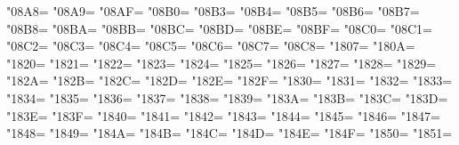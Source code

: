 \XeTeXcharclass"08A8=\KclassArabD
\XeTeXcharclass"08A9=\KclassArabD
\XeTeXcharclass"08AF=\KclassArabD
\XeTeXcharclass"08B0=\KclassArabD
\XeTeXcharclass"08B3=\KclassArabD
\XeTeXcharclass"08B4=\KclassArabD
\XeTeXcharclass"08B5=\KclassArabD
\XeTeXcharclass"08B6=\KclassArabD
\XeTeXcharclass"08B7=\KclassArabD
\XeTeXcharclass"08B8=\KclassArabD
\XeTeXcharclass"08BA=\KclassArabD
\XeTeXcharclass"08BB=\KclassArabD
\XeTeXcharclass"08BC=\KclassArabD
\XeTeXcharclass"08BD=\KclassArabD
\XeTeXcharclass"08BE=\KclassArabD
\XeTeXcharclass"08BF=\KclassArabD
\XeTeXcharclass"08C0=\KclassArabD
\XeTeXcharclass"08C1=\KclassArabD
\XeTeXcharclass"08C2=\KclassArabD
\XeTeXcharclass"08C3=\KclassArabD
\XeTeXcharclass"08C4=\KclassArabD
\XeTeXcharclass"08C5=\KclassArabD
\XeTeXcharclass"08C6=\KclassArabD
\XeTeXcharclass"08C7=\KclassArabD
\XeTeXcharclass"08C8=\KclassArabD
\XeTeXcharclass"1807=\KclassArabD
\XeTeXcharclass"180A=\KclassArabD
\XeTeXcharclass"1820=\KclassArabD
\XeTeXcharclass"1821=\KclassArabD
\XeTeXcharclass"1822=\KclassArabD
\XeTeXcharclass"1823=\KclassArabD
\XeTeXcharclass"1824=\KclassArabD
\XeTeXcharclass"1825=\KclassArabD
\XeTeXcharclass"1826=\KclassArabD
\XeTeXcharclass"1827=\KclassArabD
\XeTeXcharclass"1828=\KclassArabD
\XeTeXcharclass"1829=\KclassArabD
\XeTeXcharclass"182A=\KclassArabD
\XeTeXcharclass"182B=\KclassArabD
\XeTeXcharclass"182C=\KclassArabD
\XeTeXcharclass"182D=\KclassArabD
\XeTeXcharclass"182E=\KclassArabD
\XeTeXcharclass"182F=\KclassArabD
\XeTeXcharclass"1830=\KclassArabD
\XeTeXcharclass"1831=\KclassArabD
\XeTeXcharclass"1832=\KclassArabD
\XeTeXcharclass"1833=\KclassArabD
\XeTeXcharclass"1834=\KclassArabD
\XeTeXcharclass"1835=\KclassArabD
\XeTeXcharclass"1836=\KclassArabD
\XeTeXcharclass"1837=\KclassArabD
\XeTeXcharclass"1838=\KclassArabD
\XeTeXcharclass"1839=\KclassArabD
\XeTeXcharclass"183A=\KclassArabD
\XeTeXcharclass"183B=\KclassArabD
\XeTeXcharclass"183C=\KclassArabD
\XeTeXcharclass"183D=\KclassArabD
\XeTeXcharclass"183E=\KclassArabD
\XeTeXcharclass"183F=\KclassArabD
\XeTeXcharclass"1840=\KclassArabD
\XeTeXcharclass"1841=\KclassArabD
\XeTeXcharclass"1842=\KclassArabD
\XeTeXcharclass"1843=\KclassArabD
\XeTeXcharclass"1844=\KclassArabD
\XeTeXcharclass"1845=\KclassArabD
\XeTeXcharclass"1846=\KclassArabD
\XeTeXcharclass"1847=\KclassArabD
\XeTeXcharclass"1848=\KclassArabD
\XeTeXcharclass"1849=\KclassArabD
\XeTeXcharclass"184A=\KclassArabD
\XeTeXcharclass"184B=\KclassArabD
\XeTeXcharclass"184C=\KclassArabD
\XeTeXcharclass"184D=\KclassArabD
\XeTeXcharclass"184E=\KclassArabD
\XeTeXcharclass"184F=\KclassArabD
\XeTeXcharclass"1850=\KclassArabD
\XeTeXcharclass"1851=\KclassArabD
